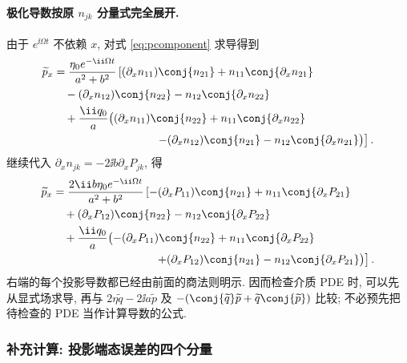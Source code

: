 \paragraph{极化导数按原 $n_{jk}$ 分量式完全展开.}
由于 $e^{\ii\Omega t}$ 不依赖 $x$, 对式 \eqref{eq:pcomponent} 求导得到
\begin{align*}
\widetilde p_x
&=\dfrac{\eta_0e^{-\ii\Omega t}}{a^2+b^2}\left[
(\partial_xn_{11})\conj{n_{21}}
+n_{11}\conj{\partial_xn_{21}}\right.\\
&\quad-(\partial_xn_{12})\conj{n_{22}}
-n_{12}\conj{\partial_xn_{22}}\\
&\quad+\dfrac{\ii q_0}{a}\bigl(
(\partial_xn_{11})\conj{n_{22}}
+n_{11}\conj{\partial_xn_{22}}\\
&\hspace{32mm}\left.
-(\partial_xn_{12})\conj{n_{21}}
-n_{12}\conj{\partial_xn_{21}}\bigr)\right].
\end{align*}
继续代入 $\partial_xn_{jk}=-2\ii b\partial_xP_{jk}$, 得
\begin{align*}
\widetilde p_x
&=\dfrac{2\ii b\eta_0e^{-\ii\Omega t}}{a^2+b^2}\left[
-(\partial_xP_{11})\conj{n_{21}}
+n_{11}\conj{\partial_xP_{21}}\right.\\
&\quad+(\partial_xP_{12})\conj{n_{22}}
-n_{12}\conj{\partial_xP_{22}}\\
&\quad+\dfrac{\ii q_0}{a}\bigl(
-(\partial_xP_{11})\conj{n_{22}}
+n_{11}\conj{\partial_xP_{22}}\\
&\hspace{32mm}\left.
+(\partial_xP_{12})\conj{n_{21}}
-n_{12}\conj{\partial_xP_{21}}\bigr)\right].
\end{align*}
右端的每个投影导数都已经由前面的商法则明示. 因而检查介质 PDE 时, 可以先从显式场求导, 再与 $2\eta\widetilde q-2\ii a\widetilde p$ 及 $-(\conj{\widetilde q}\widetilde p+\widetilde q\conj{\widetilde p})$ 比较; 不必预先把待检查的 PDE 当作计算导数的公式.

\subsubsection*{补充计算: 投影端态误差的四个分量}
